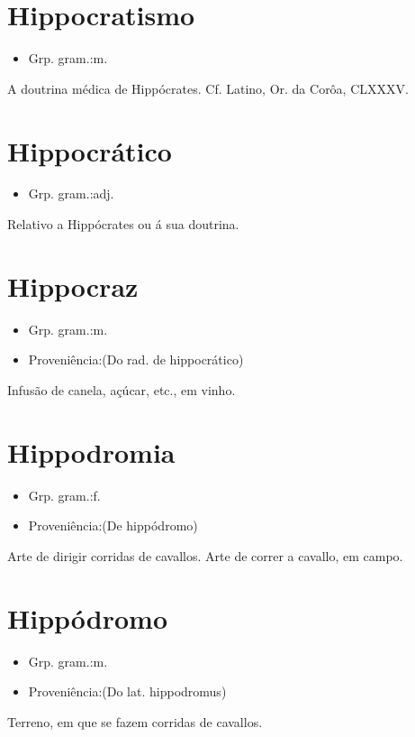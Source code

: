 \documentclass{article}
\begin{document}
\section{Hippocratismo}
\begin{itemize}
\item {Grp. gram.:m.}
\end{itemize}
A doutrina médica de Hippócrates. Cf. Latino, \textunderscore Or. da Corôa\textunderscore , CLXXXV.
\section{Hippocrático}
\begin{itemize}
\item {Grp. gram.:adj.}
\end{itemize}
Relativo a Hippócrates ou á sua doutrina.
\section{Hippocraz}
\begin{itemize}
\item {Grp. gram.:m.}
\end{itemize}
\begin{itemize}
\item {Proveniência:(Do rad. de \textunderscore hippocrático\textunderscore )}
\end{itemize}
Infusão de canela, açúcar, etc., em vinho.
\section{Hippodromia}
\begin{itemize}
\item {Grp. gram.:f.}
\end{itemize}
\begin{itemize}
\item {Proveniência:(De \textunderscore hippódromo\textunderscore )}
\end{itemize}
Arte de dirigir corridas de cavallos.
Arte de correr a cavallo, em campo.
\section{Hippódromo}
\begin{itemize}
\item {Grp. gram.:m.}
\end{itemize}
\begin{itemize}
\item {Proveniência:(Do lat. \textunderscore hippodromus\textunderscore )}
\end{itemize}
Terreno, em que se fazem corridas de cavallos.
\end{document}
